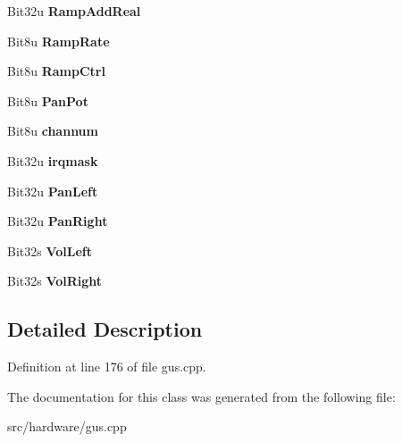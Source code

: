\begin{DoxyCompactItemize}
\item 
\hypertarget{classGUSChannels_a8a9dc6ee1379a60c06356e00ec21c4d0}{Bit32u {\bfseries Ramp\-Add\-Real}}\label{classGUSChannels_a8a9dc6ee1379a60c06356e00ec21c4d0}

\item 
\hypertarget{classGUSChannels_a795f8eff74ef91bcd3f2e56786b2ae7f}{Bit8u {\bfseries Ramp\-Rate}}\label{classGUSChannels_a795f8eff74ef91bcd3f2e56786b2ae7f}

\item 
\hypertarget{classGUSChannels_a5e53c3d380059e69241d4c2228d6b963}{Bit8u {\bfseries Ramp\-Ctrl}}\label{classGUSChannels_a5e53c3d380059e69241d4c2228d6b963}

\item 
\hypertarget{classGUSChannels_adfc57391f631967a421c68151bc8d406}{Bit8u {\bfseries Pan\-Pot}}\label{classGUSChannels_adfc57391f631967a421c68151bc8d406}

\item 
\hypertarget{classGUSChannels_ac4025f25e64fc8c0f235cdd513faf16b}{Bit8u {\bfseries channum}}\label{classGUSChannels_ac4025f25e64fc8c0f235cdd513faf16b}

\item 
\hypertarget{classGUSChannels_ab2ef78abf686814c7473539bcc197bb5}{Bit32u {\bfseries irqmask}}\label{classGUSChannels_ab2ef78abf686814c7473539bcc197bb5}

\item 
\hypertarget{classGUSChannels_a4285b8115475dff18dea76784d83ba7c}{Bit32u {\bfseries Pan\-Left}}\label{classGUSChannels_a4285b8115475dff18dea76784d83ba7c}

\item 
\hypertarget{classGUSChannels_a09b3ccc1cf8099c083e3c238ad1d8778}{Bit32u {\bfseries Pan\-Right}}\label{classGUSChannels_a09b3ccc1cf8099c083e3c238ad1d8778}

\item 
\hypertarget{classGUSChannels_a0aeb797744c172611694b90b15d50e56}{Bit32s {\bfseries Vol\-Left}}\label{classGUSChannels_a0aeb797744c172611694b90b15d50e56}

\item 
\hypertarget{classGUSChannels_a65730a7c7a5b4b64ca4519604a44b56c}{Bit32s {\bfseries Vol\-Right}}\label{classGUSChannels_a65730a7c7a5b4b64ca4519604a44b56c}

\end{DoxyCompactItemize}


\subsection{Detailed Description}


Definition at line 176 of file gus.\-cpp.



The documentation for this class was generated from the following file\-:\begin{DoxyCompactItemize}
\item 
src/hardware/gus.\-cpp\end{DoxyCompactItemize}
